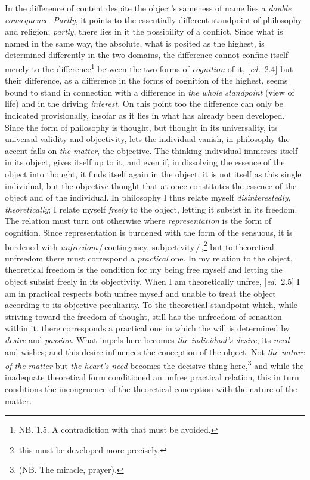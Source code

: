 \documentclass[12pt,a4paper,openany]{book}
\newcommand{\kpage}[1]{\marginnote{\footnotesize\textit{[#1]}}}
\newcommand{\ed}[1]{{\small[\textit{ed.}\ #1]}}
\newcommand{\ins}[1]{\,/\,#1\,/\,}
\begin{document}
\kpage{79}In the difference of content despite the object's sameness of name lies
a \emph{double consequence}. \emph{Partly}, it points to the essentially
different standpoint of philosophy and religion; \emph{partly}, there lies
in it the possibility of a conflict. Since what is named in the same way,
the absolute, what is posited as the highest, is determined differently
in the two domains, the difference cannot confine itself merely
to the difference\footnote[5]{NB. 1.5. A contradiction with that must be avoided.}
between the two forms of \emph{cognition} of it, \ed{2.4} but
their difference, as a difference in the forms of cognition of the
highest, seems bound to stand in connection with a difference in \emph{the whole standpoint}
(view of life) and in the driving \emph{interest}. On this
point too the difference can only be indicated provisionally, insofar as it lies in
what has already been developed. Since the form of philosophy is thought, but
thought in its universality, its universal validity and objectivity,
lets the individual vanish, in philosophy the accent falls
on \emph{the matter}, the objective. The thinking individual immerses itself in its
object, gives itself up to it, and even if, in dissolving
the essence of the object into thought, it finds itself again in the object, it is
not itself as this single individual, but the objective thought
that at once constitutes the essence of the object and of the individual. In
philosophy I thus relate myself \emph{disinterestedly}, \emph{theoretically}; I relate
myself \emph{freely} to the object, letting it subsist in its
freedom. The relation must turn out otherwise where \emph{representation} is the form
of cognition. Since representation is burdened with the form of the sensuous,
it is burdened with \emph{unfreedom}\ins{contingency, subjectivity},\footnote[6]{this must be developed more precisely.}
but to theoretical unfreedom there must correspond a \emph{practical} one. In my
relation to the object, theoretical freedom is the condition for
my being free myself and letting the object subsist freely in its objectivity.
When I am theoretically unfree, \ed{2.5} I am in practical respects both
unfree myself and unable to treat the object according to its
objective peculiarity. To the theoretical standpoint which,
while striving toward the freedom of thought, still has the unfreedom of sensation
within it, there corresponds a practical one in which the will is determined by \emph{desire} and
\emph{passion}. What impels here becomes \emph{the individual's desire}, its \emph{need} and
wishes; and this desire influences the conception of the object.
\kpage{80}Not \emph{the nature of the matter} but \emph{the heart's need} becomes the decisive thing here,\footnote[7]{(NB. The miracle, prayer).}
and while the inadequate theoretical form conditioned an unfree practical
relation, this in turn conditions the incongruence of the theoretical conception
with the nature of the matter.
\end{document}
